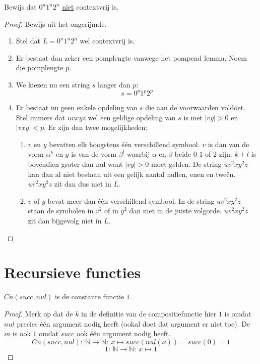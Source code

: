 \documentclass[main.tex]{subfiles}
\begin{document}
\begin{vb}
  Bewijs dat $0^{n}1^{n}2^{n}$ \underline{niet} contextvrij is.
  \begin{proof}
    Bewijs uit het ongerijmde.
    \begin{enumerate}
    \item Stel dat $L = 0^{n}1^{n}2^{n}$ wel contextvrij is.
    \item Er bestaat dan zeker een pomplengte vanwege het pompend lemma.
      Noem die pomplengte $p$.
    \item We kiezen nu een string $s$ langer dan $p$:
      \[ s = 0^{p}1^{p}2^{p} \]
    \item Er bestaat nu geen enkele opdeling van $s$ die aan de voorwaarden voldoet.
      Stel immers dat $uvxyz$ wel een geldige opdeling van $s$ is met $|vy| > 0$ en $|vxy| < p$.
      Er zijn dan twee mogelijkheden:
      \begin{enumerate}
      \item $v$ en $y$ bevatten elk hoogstens \'e\'en verschillend symbool.
        $v$ is dan van de vorm $\alpha^{k}$ en $y$ is van de vorm $\beta^{l}$ waarbij $\alpha$ en $\beta$ beide $0$ $1$ of $2$ zijn. 
        $k+l$ is bovendien groter dan nul want $|vy| > 0$ moet gelden.
        De string $uv^{2}xy^{2}z$ kan dan al niet bestaan uit een gelijk aantal nullen, enen en twe\"en.
        $uv^{2}xy^{2}z$ zit dan dus niet in $L$.
      \item $v$ of $y$ bevat meer dan \'e\'en verschillend symbool.
        In de string $uv^{2}xy^{2}z$ staan de symbolen in $v^{2}$ of in $y^{2}$ dan niet in de juiste volgorde.
        $uv^{2}xy^{2}z$ zit dan bijgevolg niet in $L$.
      \end{enumerate}
    \end{enumerate}
  \end{proof}
\end{vb}



\section{Recursieve functies}
\label{sec:recursieve-functies}

\begin{vb}
  \label{vb:recursie-const-1}
  $Cn(succ,nul)$ is de constante functie $1$.

  \begin{proof}
    Merk op dat de $k$ in de definitie van de compositiefunctie hier $1$ is omdat $nul$ precies \'e\'en argument nodig heeft (ookal doet dat argument er niet toe).
    De $m$ is ook $1$ omdat $succ$ ook \'e\'en argument nodig heeft.
    \[ Cn(succ,nul):\ \mathbb{N} \rightarrow \mathbb{N}:\ x \mapsto succ(nul(x)) = succ(0) = 1\]
    \[ 1:\ \mathbb{N} \rightarrow \mathbb{N}:\ x \mapsto 1 \]
  \end{proof}
\end{vb}
\end{document}
